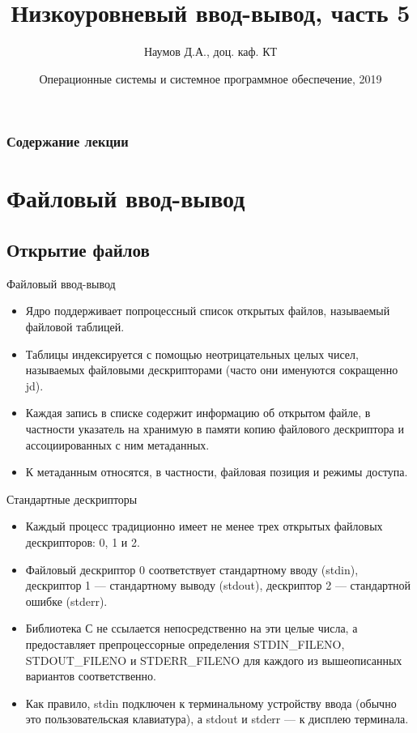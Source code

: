 \documentclass{beamer}
\title[Язык C]{Низкоуровневый ввод-вывод, часть 5}
\author{Наумов Д.А., доц. каф. КТ}
\date[02.10.2019] {Операционные системы и системное программное обеспечение, 2019}
\begin{document}
\begin{frame}
  \titlepage
\end{frame}
  
\begin{frame}
  \frametitle{Содержание лекции}
  \tableofcontents  
\end{frame}

\section{Файловый ввод-вывод}

\subsection{Открытие файлов}

\begin{frame}{Файловый ввод-вывод}
\begin{itemize}
\item Ядро поддерживает попроцессный список открытых файлов, называемый файловой таблицей. 
\item Таблицы индексируется с помощью неотрицательных целых чисел, называемых файловыми дескрипторами (часто они именуются сокращенно jd). 
\item Каждая запись в списке содержит информацию об открытом файле, в частности указатель на хранимую в памяти копию файлового дескриптора и ассоциированных с ним метаданных.
\item К метаданным относятся, в частности, файловая позиция и режимы доступа. 
\end{itemize}
\end{frame}

\begin{frame}{Стандартные дескрипторы}
\begin{itemize}
\item Каждый процесс традиционно имеет не менее трех открытых файловых дескрипторов: 0, 1 и 2. 
\item Файловый дескриптор 0 соответствует стандартному вводу (stdin), дескриптор 1 — стандартному выводу (stdout), дескриптор 2 — стандартной ошибке (stderr).
\item Библиотека С не ссылается непосредственно на эти целые числа, а предоставляет препроцессорные определения STDIN\_FILENO, STDOUT\_FILENO и STDERR\_FILENO для каждого из вышеописанных вариантов соответственно. 
\item Как правило, stdin подключен к терминальному устройству ввода (обычно это пользовательская клавиатура), а stdout и stderr — к дисплею терминала. 
\end{itemize}
\end{frame}
\end{document}
